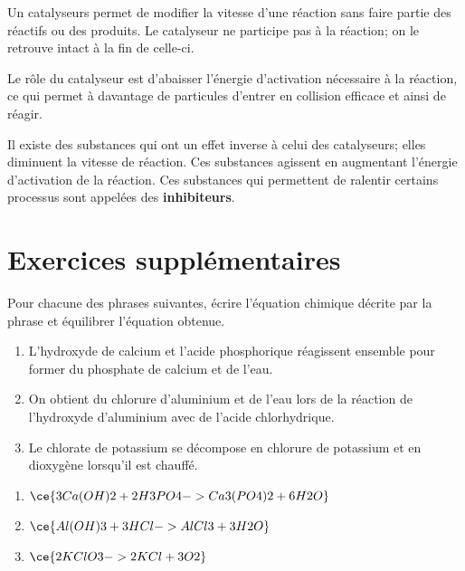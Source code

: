 \documentclass[
  11pt,
  french,
  a4paper,
  openany]{book}
\providecommand{\tightlist}{%
  \setlength{\itemsep}{0pt}\setlength{\parskip}{0pt}}
\begin{document}
Un catalyseurs permet de modifier la vitesse d'une réaction sans faire partie des réactifs ou des produits. Le catalyseur ne participe pas à la réaction; on le retrouve intact à la fin de celle-ci.

Le rôle du catalyseur est d'abaisser l'énergie d'activation nécessaire à la réaction, ce qui permet à davantage de particules d'entrer en collision efficace et ainsi de réagir.

Il existe des substances qui ont un effet inverse à celui des catalyseurs; elles diminuent la vitesse de réaction. Ces substances agissent en augmentant l'énergie d'activation de la réaction. Ces substances qui permettent de ralentir certains processus sont appelées des \textbf{inhibiteurs}.

\hypertarget{exercices-suppluxe9mentaires-8}{%
\section{Exercices supplémentaires}\label{exercices-suppluxe9mentaires-8}}

\begin{Exercise}

Pour chacune des phrases suivantes, écrire l'équation chimique décrite par la phrase et équilibrer l'équation obtenue.

\begin{enumerate}
\def\labelenumi{\arabic{enumi}.}
\tightlist
\item
  L'hydroxyde de calcium et l'acide phosphorique réagissent ensemble pour former du phosphate de calcium et de l'eau.
\item
  On obtient du chlorure d'aluminium et de l'eau lors de la réaction de l'hydroxyde d'aluminium avec de l'acide chlorhydrique.
\item
  Le chlorate de potassium se décompose en chlorure de potassium et en dioxygène lorsqu'il est chauffé.
\end{enumerate}


\end{Exercise}

\begin{Answer}

\begin{enumerate}
\def\labelenumi{\arabic{enumi}.}
\item
  \(\ce{3Ca(OH)2 + 2H3PO4 -> Ca3(PO4)2 + 6H2O}\)
\item
  \(\ce{Al(OH)3 + 3HCl -> AlCl3 + 3H2O}\)
\item
  \(\ce{2KClO3 -> 2KCl + 3O2}\)
\end{enumerate}


\end{Answer}
\end{document}
